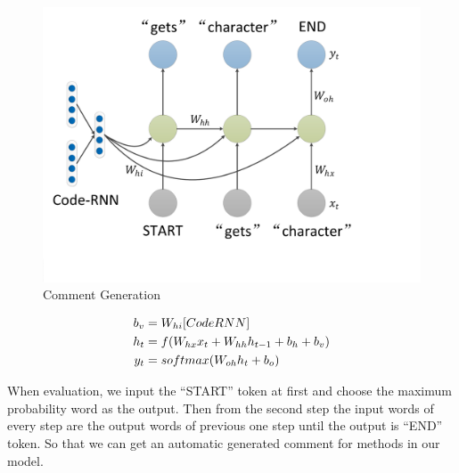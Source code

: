 \begin{figure}[!htb]
\centering
	\includegraphics[width=0.8\linewidth]{img/comment_generation.pdf}
\caption{Comment Generation}\label{fig:comment_generate}
\end{figure}

\begin{align}
b_{v} &= W_{hi}[Code\-RNN]\\
h_{t} &= f(W_{hx}x_{t} + W_{hh}h_{t-1} + b_{h} + b_{v})\\
y_{t} &= softmax(W_{oh}h_{t} + b_{o})
\end{align}

When evaluation, we input the ``START'' token at first and choose the maximum probability word as the output. Then from the second step the input words of every step are the output words of previous one step until the output is ``END'' token. So that we can get an automatic generated comment for methods in our model.

